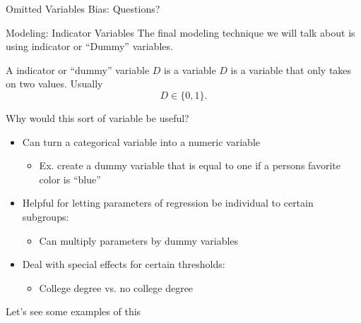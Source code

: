 \documentclass[notheorems, 9pt]{beamer}
\begin{document}
\begin{frame}{Omitted Variables Bias: Questions?} %
	\label{frame:questions-ovb} %
	\centering
\end{frame}
\begin{frame}{Modeling: Indicator Variables} %
	\label{frame:indicator} %
	The final modeling technique we will talk about is using indicator or ``Dummy'' variables.

	\begin{definition}
		\label{def:dummy}
		A indicator or ``dummy'' variable \(D\) is a variable \(D\) is a variable that only takes on two values. Usually
		 \[
		    D \in \{0,1\} 
		.\] 
	\end{definition}
	 Why would this sort of variable be useful?
	\begin{itemize}
		\item Can turn a categorical variable into a numeric variable
		\begin{itemize}
			\item Ex. create a dummy variable that is equal to one if a persons favorite color is ``blue''
		\end{itemize}
		\item Helpful for letting parameters of regression be individual to certain subgroups:
		\begin{itemize}
			\item Can multiply parameters by dummy variables
		\end{itemize}
		\item Deal with special effects for certain thresholds:
		\begin{itemize}
			\item College degree vs. no college degree
		\end{itemize}
	\end{itemize}
	Let's see some examples of this
\end{frame}
\end{document}
